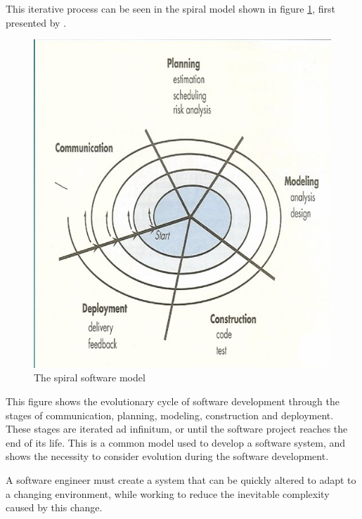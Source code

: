 This iterative process can be seen in the spiral model shown in figure \ref{spiral}, first presented by \cite{Boehm1988}.

\begin{figure}[htp]
\begin{center}
  \includegraphics[width=\textwidth]{backgroundpics/spiral}
  \caption{The spiral software model}
  \label{spiral}
\end{center}
\end{figure}

This figure shows the evolutionary cycle of software development through the stages of communication, planning, modeling, construction and deployment.
These stages are iterated ad infinitum, or until the software project reaches the end of its life. 
This is a common model used to develop a software system, and shows the necessity to consider evolution during the software development.  

A software engineer must create a system that can be quickly altered to adapt to a changing environment, 
while working to reduce the inevitable complexity caused by this change.

